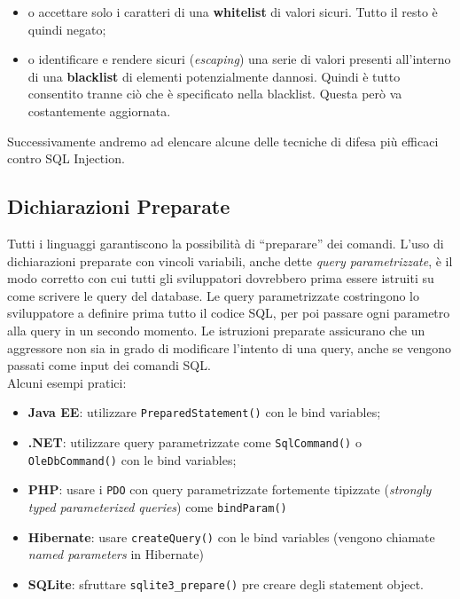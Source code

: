 \begin{itemize}
    \item o accettare solo i caratteri di una \textbf{whitelist} di valori sicuri.
          Tutto il resto è quindi negato;
    \item o identificare e rendere sicuri (\textit{escaping}) una serie di valori
          presenti all'interno di una \textbf{blacklist} di elementi
          potenzialmente dannosi. Quindi è
          tutto consentito tranne ciò che è specificato nella blacklist.
          Questa però va
          costantemente aggiornata.
\end{itemize}

Successivamente andremo ad elencare alcune delle tecniche di difesa più efficaci
contro SQL Injection.

\subsection{Dichiarazioni Preparate}

Tutti i linguaggi garantiscono la possibilità di ``preparare'' dei comandi.
L'uso di dichiarazioni preparate con vincoli variabili, anche dette
\textit{query parametrizzate}, è il modo corretto con cui tutti gli sviluppatori dovrebbero prima essere istruiti su come scrivere le query del database.
Le query parametrizzate costringono lo sviluppatore a definire prima tutto il codice SQL, per poi passare ogni parametro alla query in un secondo momento.
Le istruzioni preparate assicurano che un aggressore non sia in grado di modificare l'intento di una query, anche se vengono passati come input dei comandi SQL.\\

Alcuni esempi pratici:

\begin{itemize}
    \item \textbf{Java EE}:
          utilizzare  \verb|PreparedStatement()| con le bind variables;
    \item \textbf{.NET}:
          utilizzare query parametrizzate come \verb|SqlCommand()| o \verb|OleDbCommand()|
          con le bind variables;
    \item \textbf{PHP}: usare i \verb|PDO| con query parametrizzate fortemente tipizzate
          (\textit{strongly typed parameterized queries}) come \verb|bindParam()|
    \item \textbf{Hibernate}: usare \verb|createQuery()|
          con le bind variables (vengono chiamate \textit{named parameters}
          in Hibernate)
    \item \textbf{SQLite}: sfruttare \verb|sqlite3_prepare()|
          pre creare degli statement object.
\end{itemize}

